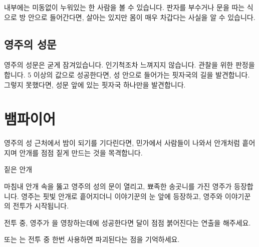 \documentclass{report}
\begin{document}
	내부에는 미동없이 누워있는 한 사람을 볼 수 있습니다. 판자를 부수거나 문을 따는 식으로 방 안으로 들어간다면, 살아는 있지만 몸이 매우 차갑다는 사실을 알 수 있습니다.
	
	\subsection{영주의 성문}
	영주의 성문은 굳게 잠겨있습니다. 인기척조차 느껴지지 않습니다. 관찰을 위한 판정을 합니다. 5 이상의 값으로 성공한다면, 성 안으로 들어가는 핏자국의 길을 발견합니다. 그렇지 못했다면, 성문 앞에 있는 핏자국 하나만을 발견합니다.
	
	\section{뱀파이어}
	영주의 성 근처에서 밤이 되기를 기다린다면, 민가에서 사람들이 나와서 안개처럼 흩어지며 안개를 점점 짙게 만드는 것을 목격합니다.
	
	\begin{lite}{짙은 안개}
	\end{lite}
	
	마침내 안개 속을 뚫고 영주의 성의 문이 열리고, 뾰족한 송곳니를 가진 영주가 등장합니다. 영주는 핏빛 안개로 흩어지더니 이야기꾼의 눈 앞에 등장하고, 영주와 이야기꾼의 전투가 시작됩니다.
	
	전투 중, 영주가 을 영창하는데에 성공한다면 달이 점점 붉어진다는 연출을 해주세요.
	
	 또는 는 전투 중 한번 사용하면 파괴된다는 점을 기억하세요.
	
\end{document}
